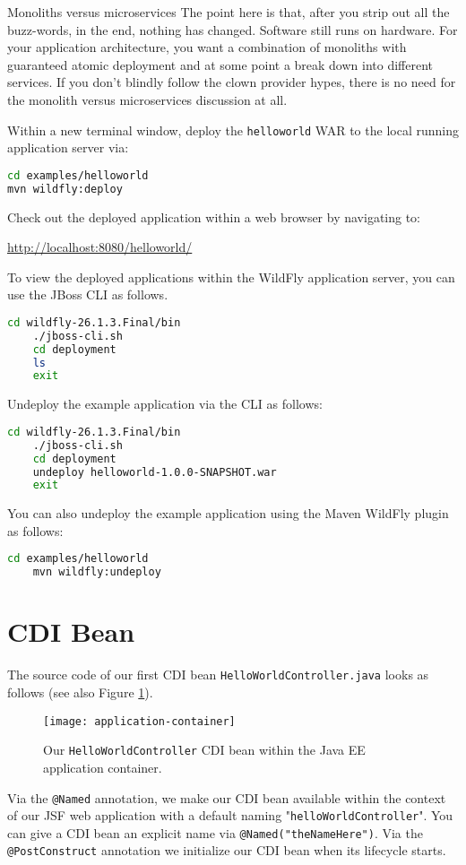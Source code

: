 \begin{ClownComputing}{Monoliths versus microservices}
	The point here is that, after you strip out all the buzz-words, in the end, nothing has changed. Software still runs on hardware.
	For your application architecture, you want a combination of monoliths with guaranteed atomic deployment and at some point a break down into different services.
	If you don't blindly follow the clown provider hypes, there is no need for the monolith versus microservices discussion at all.
\end{ClownComputing}

Within a new terminal window, deploy the \texttt{helloworld} WAR to the local running application server via:
\begin{lstlisting}[language=bash]
cd examples/helloworld
mvn wildfly:deploy
\end{lstlisting}
Check out the deployed application within a web browser by navigating to:

\url{http://localhost:8080/helloworld/}

To view the deployed applications within the WildFly application server, you can use the JBoss CLI as follows.
\begin{lstlisting}[language=bash]
	cd wildfly-26.1.3.Final/bin
	./jboss-cli.sh
	cd deployment
	ls
	exit
\end{lstlisting}

Undeploy the example application via the CLI as follows:
\begin{lstlisting}[language=bash]
	cd wildfly-26.1.3.Final/bin
	./jboss-cli.sh
	cd deployment
	undeploy helloworld-1.0.0-SNAPSHOT.war
	exit
\end{lstlisting}

You can also undeploy the example application using the Maven WildFly plugin as follows:
\begin{lstlisting}[language=bash]
	cd examples/helloworld
	mvn wildfly:undeploy
\end{lstlisting}


\section{CDI Bean}

The source code of our first CDI \cite{CDI2} bean \texttt{HelloWorldController.java} looks as follows (see also Figure \ref{fig:application-container}).
\begin{figure}[htbp]
	\begin{center}
		\texttt{[image: application-container]}
		\caption{Our \texttt{HelloWorldController} CDI bean within the Java EE application container.}
		\label{fig:application-container}
	\end{center}
\end{figure}

Via the \texttt{@Named} annotation, we make our CDI bean available within the context of our JSF web application with a default naming "\texttt{helloWorldController}".
You can give a CDI bean an explicit name via \texttt{@Named("theNameHere")}.
Via the \texttt{@PostConstruct} annotation we initialize our CDI bean when its lifecycle starts.

